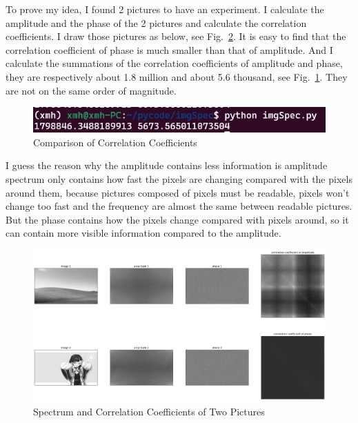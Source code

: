 \documentclass{article}
\begin{document}
To prove my idea, I found 2 pictures to have an experiment. I calculate the amplitude and the phase of the 2 pictures and calculate the correlation coefficients. I draw those pictures as below, see Fig.~\ref{fig:imgSpec}. It is easy to find that the correlation coefficient of phase is much smaller than that of amplitude. And I calculate the summations of the correlation coefficients of amplitude and phase, they are respectively about 1.8 million and about 5.6 thousand, see Fig.~\ref{fig:corrcoef}. They are not on the same order of magnitude.

\begin{figure}[!h]
	\centering
	\includegraphics[width=3 in]{../pic/corrcoef.png}
	\caption{Comparison of Correlation Coefficients}
	\label{fig:corrcoef}
\end{figure}

I guess the reason why the amplitude contains less information is amplitude spectrum only contains how fast the pixels are changing compared with the pixels around them, because pictures composed of pixels must be readable, pixels won't change too fast and the frequency are almost the same between readable pictures. But the phase contains how the pixels change compared with pixels around, so it can contain more visible information compared to the amplitude.

\begin{figure}[!h]
	\centering
	\includegraphics[width=6 in]{../pic/imgSpec.png}
	\caption{Spectrum and Correlation Coefficients of Two Pictures}
	\label{fig:imgSpec}
\end{figure}

\newpage



\end{document}
